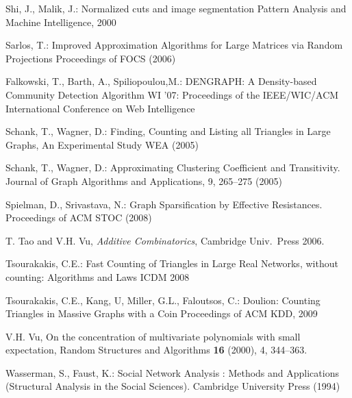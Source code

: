 \documentclass{llncs}
\begin{document}
\begin{thebibliography}{5}
Shi, J., Malik, J.:
Normalized cuts and image segmentation
Pattern Analysis and Machine Intelligence, 2000



Sarlos, T.:
Improved Approximation Algorithms for Large Matrices via Random Projections
Proceedings of FOCS (2006)


Falkowski, T., Barth, A., Spiliopoulou,M.:
DENGRAPH: A Density-based Community Detection Algorithm
WI '07: Proceedings of the IEEE/WIC/ACM International Conference on Web Intelligence



Schank, T., Wagner, D.: 
Finding, Counting and Listing all Triangles in Large Graphs, An Experimental Study
WEA (2005)

Schank, T., Wagner, D.:
Approximating Clustering Coefficient and Transitivity.
Journal of Graph Algorithms and Applications, 9, 265--275 (2005)

Spielman, D., Srivastava, N.:
Graph Sparsification by Effective Resistances.
Proceedings of ACM STOC (2008)


T. Tao and V.H. Vu, {\em Additive Combinatorics},
Cambridge Univ.\ Press 2006.

Tsourakakis, C.E.:
Fast Counting of Triangles in Large Real Networks, without counting: Algorithms and Laws
ICDM 2008

Tsourakakis, C.E., Kang, U, Miller, G.L., Faloutsos, C.:
Doulion: Counting Triangles in Massive Graphs with a Coin
Proceedings of ACM KDD, 2009



V.H. Vu,
On the concentration of multivariate polynomials with small expectation,
Random Structures and Algorithms {\bf 16} (2000), 4, 344--363.

Wasserman, S., Faust, K.:
Social Network Analysis : Methods and Applications (Structural Analysis in the Social Sciences).
Cambridge University Press (1994)




\end{thebibliography}
\end{document}
